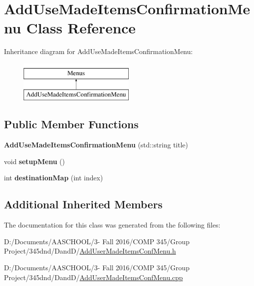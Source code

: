 \hypertarget{class_add_use_made_items_confirmation_menu}{}\section{Add\+Use\+Made\+Items\+Confirmation\+Menu Class Reference}
\label{class_add_use_made_items_confirmation_menu}
Inheritance diagram for Add\+Use\+Made\+Items\+Confirmation\+Menu\+:\begin{figure}[H]
\begin{center}
\leavevmode
\includegraphics[height=2.000000cm]{class_add_use_made_items_confirmation_menu}
\end{center}
\end{figure}
\subsection*{Public Member Functions}
\begin{DoxyCompactItemize}
\item 
\hypertarget{class_add_use_made_items_confirmation_menu_a42b0884d807085e19af8f26eb4e59af7}{}\label{class_add_use_made_items_confirmation_menu_a42b0884d807085e19af8f26eb4e59af7} 
{\bfseries Add\+Use\+Made\+Items\+Confirmation\+Menu} (std\+::string title)
\item 
\hypertarget{class_add_use_made_items_confirmation_menu_afd8437534c544cb0a1ea9e7d22fc5691}{}\label{class_add_use_made_items_confirmation_menu_afd8437534c544cb0a1ea9e7d22fc5691} 
void {\bfseries setup\+Menu} ()
\item 
\hypertarget{class_add_use_made_items_confirmation_menu_a0d1780fdc7b5c794b148fdf6a8d6c07d}{}\label{class_add_use_made_items_confirmation_menu_a0d1780fdc7b5c794b148fdf6a8d6c07d} 
int {\bfseries destination\+Map} (int index)
\end{DoxyCompactItemize}
\subsection*{Additional Inherited Members}


The documentation for this class was generated from the following files\+:\begin{DoxyCompactItemize}
\item 
D\+:/\+Documents/\+A\+A\+S\+C\+H\+O\+O\+L/3-\/ Fall 2016/\+C\+O\+M\+P 345/\+Group Project/345dnd/\+Dand\+D/\hyperlink{_add_user_made_items_conf_menu_8h}{Add\+User\+Made\+Items\+Conf\+Menu.\+h}\item 
D\+:/\+Documents/\+A\+A\+S\+C\+H\+O\+O\+L/3-\/ Fall 2016/\+C\+O\+M\+P 345/\+Group Project/345dnd/\+Dand\+D/\hyperlink{_add_user_made_items_conf_menu_8cpp}{Add\+User\+Made\+Items\+Conf\+Menu.\+cpp}\end{DoxyCompactItemize}
